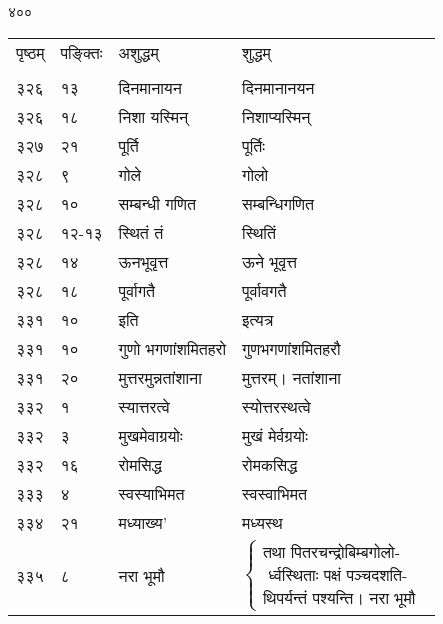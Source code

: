 \documentclass[11pt, openany]{book}
\begin{document}
\newpage

\begin{center}
   ४००
\end{center}

\begin{longtable}{p{1cm} p{1.5cm} p{4cm} p{4.5cm}}

 पृष्ठम् & पङ्क्तिः & अशुद्धम् & शुद्धम्\\
\vspace{2mm}\\

 ३२६ & १३ & दिनमानायन & दिनमानानयन \\

 ३२६ & १८ & निशा यस्मिन् & निशाप्यस्मिन् \\

 ३२७ & २१ & पूर्ति & पूर्तिः \\

 ३२८ & ९ & गोले & गोलो \\

 ३२८ & १० & सम्बन्धी गणित & सम्बन्धिगणित \\

 ३२८ & १२-१३ & स्थितं तं & स्थितिं \\

 ३२८ & १४ & ऊनभूवृत्त & ऊने भूवृत्त \\

 ३२८ & १८ & पूर्वागतै & पूर्वावगतै \\

 ३३१ & १० & इति & इत्यत्र \\

 ३३१ & १० & गुणो भगणांशमितहरो & गुणभगणांशमितहरौ \\

 ३३१ & २० & मुत्तरमुन्नतांशाना & मुत्तरम्। नतांशाना \\

 ३३२ & १ & स्यात्तरत्वे & स्योत्तरस्थत्वे \\

 ३३२ & ३ & मुखमेवाग्रयोः & मुखं मेर्वग्रयोः \\

 ३३२ & १६ & रोमसिद्ध & रोमकसिद्ध \\

 ३३३ & ४  & स्वस्याभिमत & स्वस्वाभिमत \\

 ३३४ & २१ & मध्याख्य' & मध्यस्थ \\

३३५ & ८ & नरा भूमौ  & $\begin{cases}\mbox{तथा पितरचन्द्रोबिम्बगोलो-}\\
\mbox{ र्ध्वस्थिताः पक्षं पञ्चदशति-}\\
\mbox{थिपर्यन्तं पश्यन्ति। नरा भूमौ }\end{cases}$\\


\end{longtable}
\end{document}
